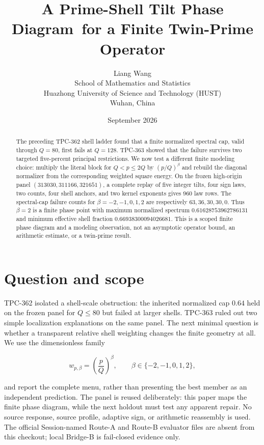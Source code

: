 \documentclass[10pt]{article}
\title{A Prime-Shell Tilt Phase Diagram\ for a Finite Twin-Prime Operator}
\author{Liang Wang\\
\small School of Mathematics and Statistics\\
\small Huazhong University of Science and Technology (HUST)\\
\small Wuhan, China}
\date{September 2026}
\begin{document}
\maketitle

\begin{abstract}
The preceding TPC-362 shell ladder found that a finite normalized spectral
cap, valid through $Q=80$, first fails at $Q=128$.  TPC-363 showed that the
failure survives two targeted five-percent principal restrictions.  We now
test a different finite modeling choice: multiply the literal block for
$Q<p\leq 2Q$ by $(p/Q)^\beta$ and rebuild the diagonal normalizer from the
corresponding weighted square energy.  On the frozen high-origin panel
$(313030,311166,321651)$, a complete replay of five integer tilts, four sign
laws, two counts, four shell anchors, and two kernel exponents gives 960 law
rows.  The spectral-cap failure counts for
$\beta=-2,-1,0,1,2$ are respectively $63,36,30,30,0$.  Thus $\beta=2$ is a
finite phase point with maximum normalized spectrum
$0.61628753962786131$ and minimum effective shell fraction
$0.66938300094026681$.  This is a scoped finite phase diagram and a modeling
observation, not an asymptotic operator bound, an arithmetic estimate, or a
twin-prime result.
\end{abstract}

\section{Question and scope}

TPC-362 isolated a shell-scale obstruction: the inherited normalized cap
$0.64$ held on the frozen panel for $Q\leq80$ but failed at larger shells.
TPC-363 ruled out two simple localization explanations on the same panel.
The next minimal question is whether a transparent relative shell weighting
changes the finite geometry at all.  We use the dimensionless family

\[
        w_{p,\beta}=\left(\frac pQ\right)^\beta,
        \qquad \beta\in\{-2,-1,0,1,2\},
\]

and report the complete menu, rather than presenting the best member as an
independent prediction.  The panel is reused deliberately: this paper maps
the finite phase diagram, while the next holdout must test any apparent
repair.  No source response, source profile, adaptive sign, or arithmetic
reassembly is used.  The official Session-named Route-A and Route-B evaluator
files are absent from this checkout; local Bridge-B is fail-closed evidence
only.
\end{document}
